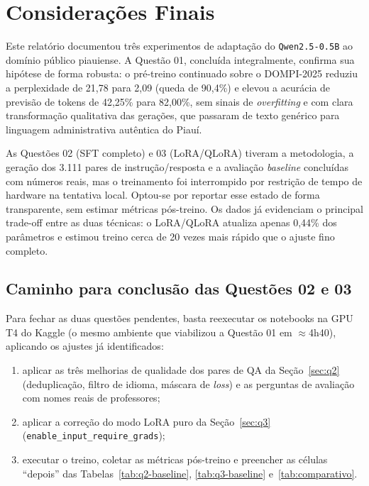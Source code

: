 \section{Considerações Finais}
\label{sec:consideracoes}

Este relatório documentou três experimentos de adaptação do \texttt{Qwen2.5-0.5B} ao
domínio público piauiense. A Questão 01, concluída integralmente, confirma sua
hipótese de forma robusta: o pré-treino continuado sobre o DOMPI-2025 reduziu a
perplexidade de 21,78 para 2,09 (queda de 90,4\%) e elevou a acurácia de previsão de
tokens de 42,25\% para 82,00\%, sem sinais de \textit{overfitting} e com clara
transformação qualitativa das gerações, que passaram de texto genérico para linguagem
administrativa autêntica do Piauí.

As Questões 02 (SFT completo) e 03 (LoRA/QLoRA) tiveram a metodologia, a geração dos
3.111 pares de instrução/resposta e a avaliação \textit{baseline} concluídas com
números reais, mas o treinamento foi interrompido por restrição de tempo de hardware
na tentativa local. Optou-se por reportar esse estado de forma transparente, sem
estimar métricas pós-treino. Os dados já evidenciam o principal trade-off entre as
duas técnicas: o LoRA/QLoRA atualiza apenas 0,44\% dos parâmetros e estimou treino
cerca de 20 vezes mais rápido que o ajuste fino completo.

\subsection{Caminho para conclusão das Questões 02 e 03}

Para fechar as duas questões pendentes, basta reexecutar os notebooks na GPU T4 do
Kaggle (o mesmo ambiente que viabilizou a Questão 01 em $\approx$4h40), aplicando os
ajustes já identificados:

\begin{enumerate}[leftmargin=2.2em]
  \item aplicar as três melhorias de qualidade dos pares de QA da
        Seção~\ref{sec:q2} (deduplicação, filtro de idioma, máscara de \textit{loss})
        e as perguntas de avaliação com nomes reais de professores;
  \item aplicar a correção do modo LoRA puro da Seção~\ref{sec:q3}
        (\texttt{enable\_input\_require\_grads});
  \item executar o treino, coletar as métricas pós-treino e preencher as células
        ``depois'' das Tabelas~\ref{tab:q2-baseline}, \ref{tab:q3-baseline}
        e~\ref{tab:comparativo}.
\end{enumerate}

